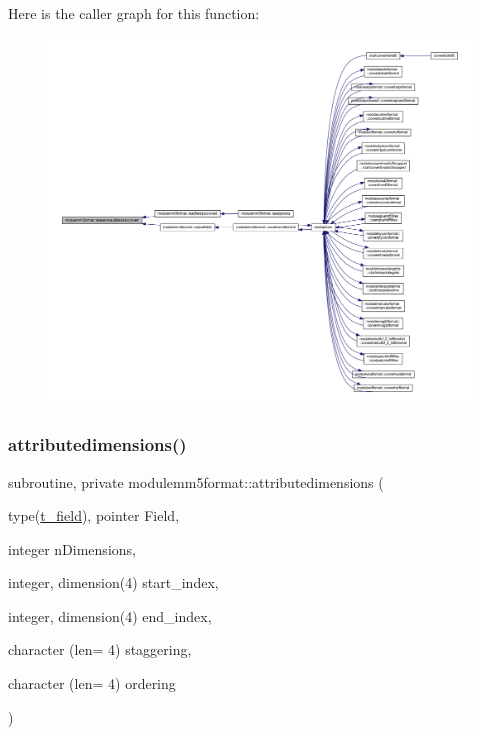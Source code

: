 Here is the caller graph for this function\+:\nopagebreak
\begin{figure}[H]
\begin{center}
\leavevmode
\includegraphics[width=350pt]{namespacemodulemm5format_a34e4f7cd15886ee4867c43357fc8f717_icgraph}
\end{center}
\end{figure}
\mbox{\label{namespacemodulemm5format_a0c0413b1da7f8da860aef9b811b0c725}} 
\subsubsection{\texorpdfstring{attributedimensions()}{attributedimensions()}}
{\footnotesize\ttfamily subroutine, private modulemm5format\+::attributedimensions (\begin{DoxyParamCaption}\item[{type(\mbox{\hyperlink{structmodulemm5format_1_1t__field}{t\+\_\+field}}), pointer}]{Field,  }\item[{integer}]{n\+Dimensions,  }\item[{integer, dimension(4)}]{start\+\_\+index,  }\item[{integer, dimension(4)}]{end\+\_\+index,  }\item[{character (len= 4)}]{staggering,  }\item[{character (len= 4)}]{ordering }\end{DoxyParamCaption})\hspace{0.3cm}{\ttfamily [private]}}

